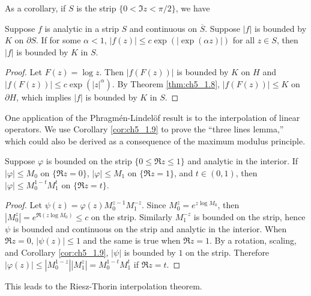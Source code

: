 As a corollary, if $S$ is the strip $\{0 < \Im z < \pi/2\}$, we have

\begin{corollary}\label{cor:ch5_1.9}
Suppose $f$ is analytic in a strip $S$ and continuous on $\overline{S}$. Sup\-pose $|f|$ is bounded by $K$ on $\partial S$. If for some $\alpha < 1$, $|f(z)| \leq c\exp(|\exp(\alpha z)|)$ for all $z \in S$, then $|f|$ is bounded by $K$ in $S$.
\end{corollary}

\begin{proof}
Let $F(z) = \log z$. Then $|f(F(z))|$ is bounded by $K$ on $H$ and $|f(F(z))| \leq c\exp(|z|^\alpha)$. By Theorem \ref{thm:ch5_1.8}, $|f(F(z))| \leq K$ on $\partial H$, which implies $|f|$ is bounded by $K$ in $S$.
\end{proof}



One application of the Phragm\'en-Lindel\"of result is to the interpolation of linear operators. We use Corollary \ref{cor:ch5_1.9} to prove the ``three lines lemma,'' which could also be derived as a consequence of the maximum modulus principle.

\begin{lemma}\label{lem:ch5_1.10}
Suppose $\varphi$ is bounded on the strip $\{0 \leq \Re z \leq 1\}$ and analytic in the interior. If $|\varphi| \leq M_0$ on $\{\Re z = 0\}$, $|\varphi| \leq M_1$ on $\{\Re z = 1\}$, and $t \in (0,1)$, then $|\varphi| \leq M_0^{1-t}M_1^t$ on $\{\Re z = t\}$.
\end{lemma}

\begin{proof}
Let $\psi(z) = \varphi(z)M_0^{z-1}M_1^{-z}$. Since $M_0^z = e^{z\log M_0}$, then  $|M_0^z| = e^{\Re(z\log M_0)}\le c$ on the strip. Similarly $M_1^{-z}$ is bounded on the strip, hence $\psi$ is bounded and continuous on the strip and analytic in the interior. When $\Re z = 0$, $|\psi(z)|\le 1$ and the same is true when $\Re z = 1$. By a rotation, scaling, and Corollary \ref{cor:ch5_1.9}, $|\psi|$ is bounded by $1$ on the strip. Therefore $|\varphi(z)| \leq |M_0^{1-z}||M_1^z| = M_0^{1-t}M_1^t$ if $\Re z = t$.
\end{proof}

This leads to the Riesz-Thorin interpolation theorem.

